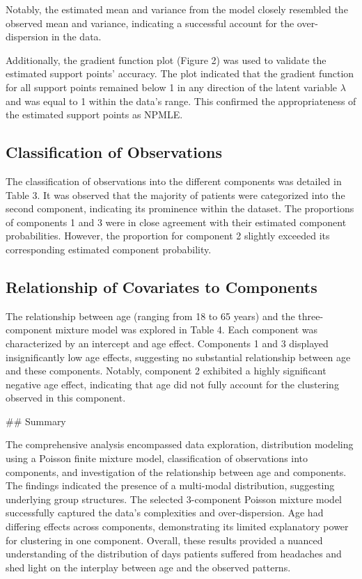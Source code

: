 \documentclass[a4paper, 12pt]{article}
\begin{document}
Notably, the estimated mean and variance from the model closely resembled the observed mean and variance, indicating a successful account for the over-dispersion in the data.

Additionally, the gradient function plot (Figure 2) was used to validate the estimated support points' accuracy. The plot indicated that the gradient function for all support points remained below 1 in any direction of the latent variable $\lambda$ and was equal to 1 within the data's range. This confirmed the appropriateness of the estimated support points as NPMLE.

\subsection{ Classification of Observations}

The classification of observations into the different components was detailed in Table 3. It was observed that the majority of patients were categorized into the second component, indicating its prominence within the dataset. The proportions of components 1 and 3 were in close agreement with their estimated component probabilities. However, the proportion for component 2 slightly exceeded its corresponding estimated component probability.

\subsection{ Relationship of Covariates to Components}

The relationship between age (ranging from 18 to 65 years) and the three-component mixture model was explored in Table 4. Each component was characterized by an intercept and age effect. Components 1 and 3 displayed insignificantly low age effects, suggesting no substantial relationship between age and these components. Notably, component 2 exhibited a highly significant negative age effect, indicating that age did not fully account for the clustering observed in this component.

## Summary

The comprehensive analysis encompassed data exploration, distribution modeling using a Poisson finite mixture model, classification of observations into components, and investigation of the relationship between age and components. The findings indicated the presence of a multi-modal distribution, suggesting underlying group structures. The selected 3-component Poisson mixture model successfully captured the data's complexities and over-dispersion. Age had differing effects across components, demonstrating its limited explanatory power for clustering in one component. Overall, these results provided a nuanced understanding of the distribution of days patients suffered from headaches and shed light on the interplay between age and the observed patterns.
\end{document}
